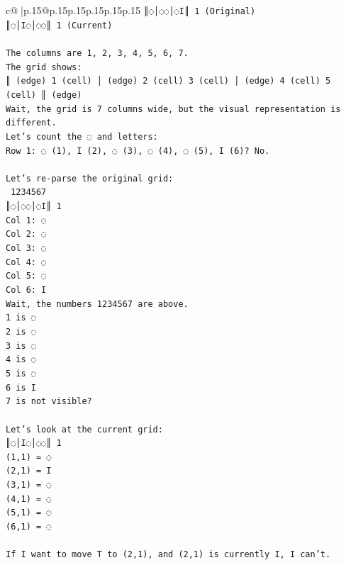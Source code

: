 \documentclass{article}
\begin{document}
{\begin{supertabular}{c@{$\;$}|p{.15\linewidth}@{}p{.15\linewidth}p{.15\linewidth}p{.15\linewidth}p{.15\linewidth}p{.15\linewidth}}
{{{\texttt{║◌│◌◌│◌I║ 1 (Original)} \\
\texttt{║◌│I◌│◌◌║ 1 (Current)} \\
\\ 
\texttt{The columns are 1, 2, 3, 4, 5, 6, 7.} \\
\texttt{The grid shows:} \\
\texttt{║ (edge) 1 (cell) │ (edge) 2 (cell) 3 (cell) │ (edge) 4 (cell) 5 (cell) ║ (edge)} \\
\texttt{Wait, the grid is 7 columns wide, but the visual representation is different.} \\
\texttt{Let's count the ◌ and letters:} \\
\texttt{Row 1: ◌ (1), I (2), ◌ (3), ◌ (4), ◌ (5), I (6)? No.} \\
\\ 
\texttt{Let's re{-}parse the original grid:} \\
\texttt{ 1234567} \\
\texttt{║◌│◌◌│◌I║ 1} \\
\texttt{Col 1: ◌} \\
\texttt{Col 2: ◌} \\
\texttt{Col 3: ◌} \\
\texttt{Col 4: ◌} \\
\texttt{Col 5: ◌} \\
\texttt{Col 6: I} \\
\texttt{Wait, the numbers 1234567 are above.} \\
\texttt{1 is ◌} \\
\texttt{2 is ◌} \\
\texttt{3 is ◌} \\
\texttt{4 is ◌} \\
\texttt{5 is ◌} \\
\texttt{6 is I} \\
\texttt{7 is not visible?} \\
\\ 
\texttt{Let's look at the current grid:} \\
\texttt{║◌│I◌│◌◌║ 1} \\
\texttt{(1,1) = ◌} \\
\texttt{(2,1) = I} \\
\texttt{(3,1) = ◌} \\
\texttt{(4,1) = ◌} \\
\texttt{(5,1) = ◌} \\
\texttt{(6,1) = ◌} \\
\\ 
\texttt{If I want to move T to (2,1), and (2,1) is currently I, I can't.} \\
}}}
\end{supertabular}}
\end{document}
